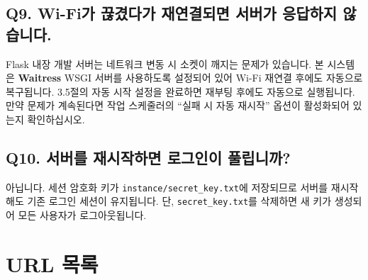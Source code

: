 \documentclass[a4paper,12pt]{article}
\begin{document}
\subsection*{Q9. Wi-Fi가 끊겼다가 재연결되면 서버가 응답하지 않습니다.}

Flask 내장 개발 서버는 네트워크 변동 시 소켓이 깨지는 문제가 있습니다.
본 시스템은 \textbf{Waitress} WSGI 서버를 사용하도록 설정되어 있어 Wi-Fi 재연결 후에도
자동으로 복구됩니다. 3.5절의 자동 시작 설정을 완료하면 재부팅 후에도 자동으로 실행됩니다.
만약 문제가 계속된다면 작업 스케줄러의 ``실패 시 자동 재시작'' 옵션이 활성화되어 있는지 확인하십시오.

\subsection*{Q10. 서버를 재시작하면 로그인이 풀립니까?}

아닙니다. 세션 암호화 키가 \texttt{instance/secret\_key.txt}에 저장되므로
서버를 재시작해도 기존 로그인 세션이 유지됩니다.
단, \texttt{secret\_key.txt}를 삭제하면 새 키가 생성되어 모든 사용자가 로그아웃됩니다.

\section{URL 목록}
\end{document}
